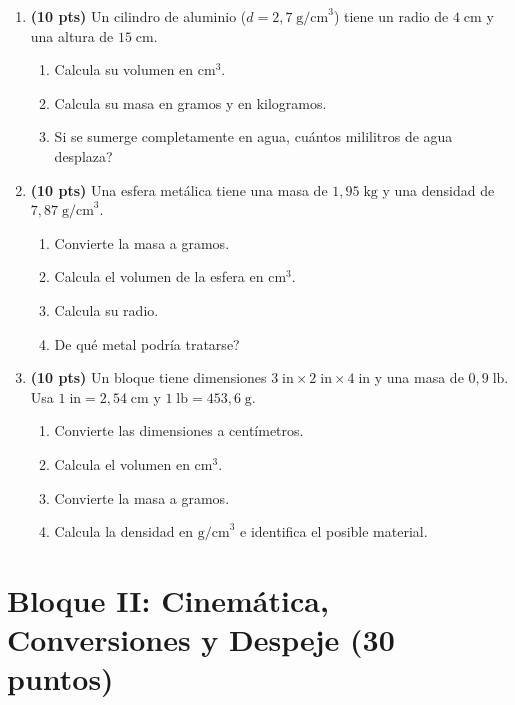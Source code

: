 \documentclass[12pt, letterpaper]{article}
\begin{document}
\begin{enumerate}[leftmargin=*]
  \item \textbf{(10 pts)} Un cilindro de aluminio ($d = 2{,}7\;\text{g/cm}^3$) tiene un radio de $4\;\text{cm}$ y una altura de $15\;\text{cm}$.
        \begin{enumerate}[label=\alph*)]
          \item Calcula su volumen en $\text{cm}^3$.
          \item Calcula su masa en gramos y en kilogramos.
          \item Si se sumerge completamente en agua, \textquestiondown cuántos mililitros de agua desplaza?
        \end{enumerate}

  \item \textbf{(10 pts)} Una esfera metálica tiene una masa de $1{,}95\;\text{kg}$ y una densidad de $7{,}87\;\text{g/cm}^3$.
        \begin{enumerate}[label=\alph*)]
          \item Convierte la masa a gramos.
          \item Calcula el volumen de la esfera en $\text{cm}^3$.
          \item Calcula su radio.
          \item \textquestiondown De qué metal podría tratarse?
        \end{enumerate}

  \item \textbf{(10 pts)} Un bloque tiene dimensiones $3\;\text{in} \times 2\;\text{in} \times 4\;\text{in}$ y una masa de $0{,}9\;\text{lb}$. Usa $1\;\text{in} = 2{,}54\;\text{cm}$ y $1\;\text{lb} = 453{,}6\;\text{g}$.
        \begin{enumerate}[label=\alph*)]
          \item Convierte las dimensiones a centímetros.
          \item Calcula el volumen en $\text{cm}^3$.
          \item Convierte la masa a gramos.
          \item Calcula la densidad en $\text{g/cm}^3$ e identifica el posible material.
        \end{enumerate}
\end{enumerate}

\newpage

\section{Bloque II: Cinemática, Conversiones y Despeje (30 puntos)}
\end{document}
